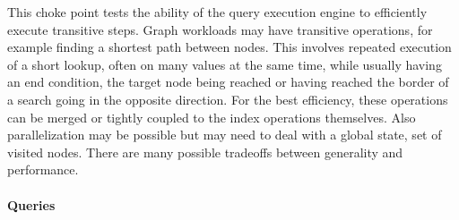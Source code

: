 
This choke point tests the ability of the query execution engine to efficiently
execute transitive steps. Graph workloads may have transitive operations, for
example finding a shortest path between nodes. This involves repeated execution
of a short lookup, often on many values at the same time, while usually having
an end condition, \eg the target node being reached or having reached the border
of a search going in the opposite direction. For the best efficiency, these
operations can be merged or tightly coupled to the index operations themselves.
Also parallelization may be possible but may need to deal with a global state,
\eg set of visited nodes. There are many possible tradeoffs between generality
and performance.


\paragraph{Queries}
{\raggedright

}